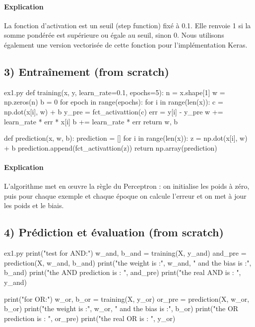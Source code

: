 \documentclass[12pt,a4paper]{article}
\begin{document}
\paragraph{Explication}
La fonction d'activation est un seuil (step function) fixé à 0.1.
Elle renvoie 1 si la somme pondérée est supérieure ou égale au seuil, sinon 0.
Nous utilisons également une version vectorisée de cette fonction pour l'implémentation Keras.


\subsection*{3) Entraînement (from scratch)}

\begin{codeholder}{ex1.py}
def training(x, y, learn_rate=0.1, epochs=5):
    n = x.shape[1]
    w = np.zeros(n)
    b = 0
    for epoch in range(epochs):
        for i in range(len(x)):
            c = np.dot(x[i], w) + b
            y_pre = fct_activattion(c)
            err = y[i] - y_pre
            w += learn_rate * err * x[i]
            b += learn_rate * err
    return w, b

def prediction(x, w, b):
    prediction = []
    for i in range(len(x)):
        z = np.dot(x[i], w) + b
        prediction.append(fct_activattion(z))
    return np.array(prediction)
\end{codeholder}

\paragraph{Explication}
L'algorithme met en œuvre la règle du Perceptron : on initialise les poids
à zéro, puis pour chaque exemple et chaque époque on calcule l'erreur
et on met à jour les poids et le biais.


\subsection*{4) Prédiction et évaluation (from scratch)}

\begin{codeholder}{ex1.py}
print("test for AND:\n")
w_and, b_and = training(X, y_and)
and_pre = prediction(X, w_and, b_and)
print("the weight is :", w_and, " and the bias is :", b_and)
print("the AND prediction is : ", and_pre)
print("the real AND is : ", y_and)

print("\ntest for OR:\n")
w_or, b_or = training(X, y_or)
or_pre = prediction(X, w_or, b_or)
print("the weight is :", w_or, " and the bias is :", b_or)
print("the OR prediction is : ", or_pre)
print("the real OR is : ", y_or)
\end{codeholder}
\end{document}
